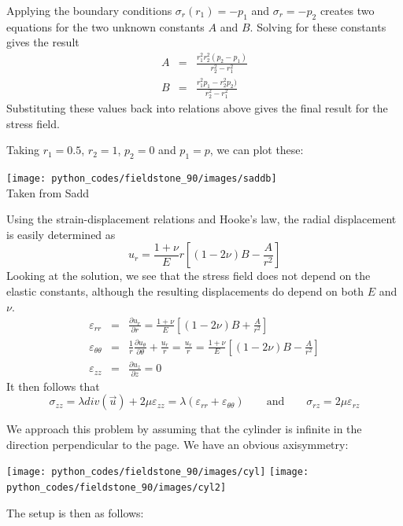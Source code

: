 Applying the boundary conditions 
$\sigma_r(r_1)=-p_1$ and $\sigma_r=-p_2$ 
creates two equations
for the two unknown constants $A$ and $B$. 
Solving for these constants gives the result
\begin{eqnarray}
A &=& \frac{r_1^2r_2^2(p_2-p_1)}{r_2^2-r_1^2} \\
B &=& \frac{r_1^2p_1-r_2^2p_2 )}{r_2^2-r_1^2} 
\end{eqnarray}
Substituting these values back into relations above gives the final result for the stress field.

Taking $r_1=0.5$, $r_2=1$, $p_2=0$ and $p_1=p$, we can plot these:
\begin{center}
\texttt{[image: python\_codes/fieldstone\_90/images/saddb]}\\
{\captionfont Taken from Sadd \cite{sadd14}}
\end{center}

Using the strain-displacement relations and Hooke's law, the radial
displacement is easily determined as
\[
u_r = \frac{1+\nu}{E}r \left[ (1-2\nu) B - \frac{A}{r^2}\right]
\]
Looking at the solution, we see that 
the stress field does not depend on the elastic constants, although the
resulting displacements do depend on both $E$ and $\nu$.
\begin{eqnarray}
\varepsilon_{rr} &=& \frac{\partial u_r}{\partial r} = 
\frac{1+\nu}{E} \left[ (1-2\nu) B + \frac{A}{r^2}\right]
\\
\varepsilon_{\theta\theta} &=& \frac1r \frac{\partial u_\theta}{\partial \theta} + \frac{u_r}{r} 
=\frac{u_r}{r}  
=\frac{1+\nu}{E} \left[ (1-2\nu) B - \frac{A}{r^2}\right] 
\\
\varepsilon_{zz} &=& \frac{\partial u_z}{\partial z} = 0 
\end{eqnarray}
It then follows that 
\[
\sigma_{zz} = \lambda div(\vec{u}) + 2 \mu \varepsilon_{zz} = 
\lambda (\varepsilon_{rr} + \varepsilon_{\theta\theta})
\qquad
\text{and}
\qquad
\sigma_{rz} = 2 \mu \varepsilon_{rz} 
\]

We approach this problem by assuming that the cylinder is infinite in the direction perpendicular 
to the page. We have an obvious axisymmetry: 

\begin{center}
\texttt{[image: python\_codes/fieldstone\_90/images/cyl]}
\texttt{[image: python\_codes/fieldstone\_90/images/cyl2]}\\
\end{center}

The setup is then as follows:

